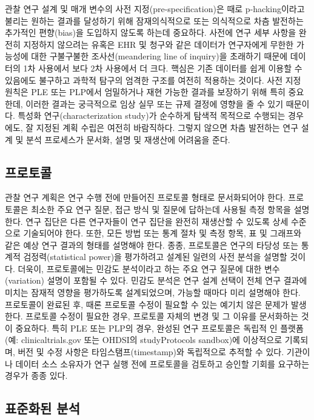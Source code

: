\documentclass[11pt]{book}
\theoremstyle{definition}
\theoremstyle{definition}
\theoremstyle{definition}
\theoremstyle{remark}
\begin{document}
관찰 연구 설계 및 매개 변수의 사전 지정(pre-specification)은 때로
p-hacking이라고 불리는 원하는 결과를 달성하기 위해 잠재의식적으로 또는
의식적으로 차츰 발전하는 추가적인 편향(bias)을 도입하지 않도록 하는데
중요하다. 사전에 연구 세부 사항을 완전히 지정하지 않으려는 유혹은 EHR 및
청구와 같은 데이터가 연구자에게 무한한 가능성에 대한 구불구불한
조사선(meandering line of inquiry)을 초래하기 때문에 데이터의 1차
사용에서 보다 2차 사용에서 더 크다. 핵심은 기존 데이터를 쉽게 이용할 수
있음에도 불구하고 과학적 탐구의 엄격한 구조를 여전히 적용하는 것이다.
사전 지정 원칙은 PLE 또는 PLP에서 엄밀하거나 재현 가능한 결과를 보장하기
위해 특히 중요한데, 이러한 결과는 궁극적으로 임상 실무 또는 규제 결정에
영향을 줄 수 있기 때문이다. 특성화 연구(characterization study)가
순수하게 탐색적 목적으로 수행되는 경우에도, 잘 지정된 계획 수립은 여전히
바람직하다. 그렇지 않으면 차츰 발전하는 연구 설계 및 분석 프로세스가
문서화, 설명 및 재생산에 어려움을 준다.

\subsection{프로토콜}


관찰 연구 계획은 연구 수행 전에 만들어진 프로토콜 형태로 문서화되어야
한다. 프로토콜은 최소한 주요 연구 질문, 접근 방식 및 질문에 답하는데
사용될 측정 항목을 설명한다. 연구 집단은 다른 연구자들이 연구 집단을
완전히 재생산할 수 있도록 상세 수준으로 기술되어야 한다. 또한, 모든 방법
또는 통계 절차 및 측정 항목, 표 및 그래프와 같은 예상 연구 결과의 형태를
설명해야 한다. 종종, 프로토콜은 연구의 타당성 또는 통계적
검정력(statistical power)을 평가하려고 설계된 일련의 사전 분석을 설명할
것이다. 더욱이, 프로토콜에는 민감도 분석이라고 하는 주요 연구 질문에
대한 변수(variation) 설명이 포함될 수 있다. 민감도 분석은 연구 설계
선택이 전체 연구 결과에 미치는 잠재적 영향을 평가하도록 설계되었으며,
가능할 때마다 미리 설명해야 한다. 프로토콜이 완료된 후, 때론 프로토콜
수정이 필요할 수 있는 예기치 않은 문제가 발생한다. 프로토콜 수정이
필요한 경우, 프로토콜 자체의 변경 및 그 이유를 문서화하는 것이 중요하다.
특히 PLE 또는 PLP의 경우, 완성된 연구 프로토콜은 독립적 인 플랫폼(예:
clinicaltrials.gov 또는 OHDSI의 studyProtocols sandbox)에 이상적으로
기록되며, 버전 및 수정 사항은 타임스탬프(timestamp)와 독립적으로 추적할
수 있다. 기관이나 데이터 소스 소유자가 연구 실행 전에 프로토콜을
검토하고 승인할 기회를 요구하는 경우가 종종 있다.

\subsection{표준화된 분석}\label{-}
\end{document}
